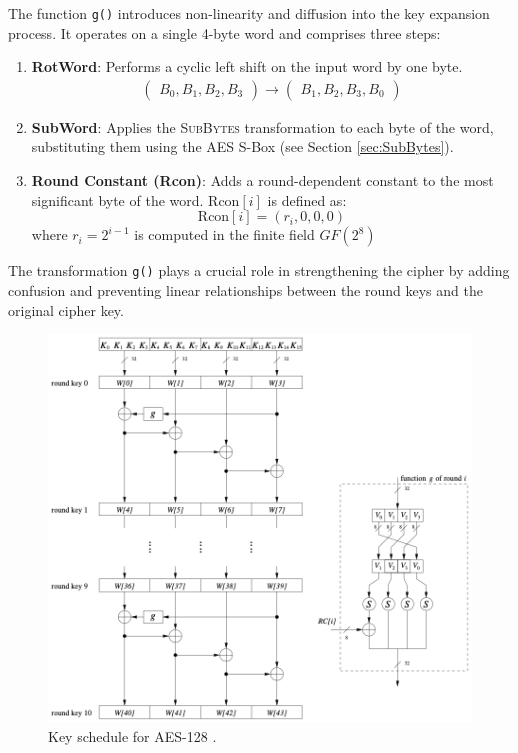 The function \texttt{g()} introduces non-linearity and diffusion into the key expansion process. 
It operates on a single 4-byte word and comprises three steps:
\begin{enumerate}
    \item \textbf{RotWord}: Performs a cyclic left shift on the input word by one byte.
    \begin{align}
        \begin{pmatrix}
            B_0, B_1, B_2, B_3
        \end{pmatrix}
        \rightarrow
        \begin{pmatrix}
            B_1, B_2, B_3, B_0
        \end{pmatrix}
    \end{align}

    \item \textbf{SubWord}: Applies the \textsc{SubBytes} transformation to each byte of the word, substituting them using the AES S-Box (see Section \ref{sec:SubBytes}).
    
    \item \textbf{Round Constant (Rcon)}: Adds a round-dependent constant to the most significant byte of the word. 
    $\text{Rcon}[i]$ is defined as:
    \begin{equation}
        \text{Rcon}[i] = (r_i, 0, 0, 0)
    \end{equation}
    where $r_i = 2^{i-1}$ is computed in the finite field $GF(2^8)$
\end{enumerate}

The transformation \texttt{g()} plays a crucial role in strengthening the cipher by adding confusion and preventing linear relationships between the round keys and the original cipher key.

\begin{figure}[!ht]
    \centering
    \includegraphics[width=\textwidth]{img/key-schedule-128.png}
    \caption{Key schedule for AES-128 \cite{Paar2024}.}
    \label{fig:key-schedule-128}
\end{figure}

